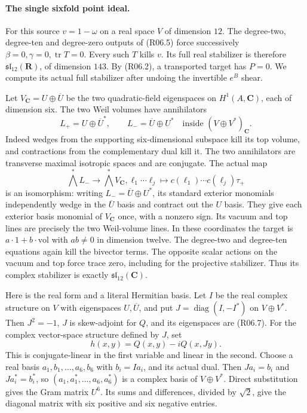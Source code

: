\paragraph{The single sixfold point ideal.}
For this source $v=1-\omega$ on a real space $V$ of dimension
$12$. The degree-two, degree-ten and degree-zero outputs of
(R06.5) force successively $\beta=0,\gamma=0,\operatorname{tr}T=0$.
Every such $T$ kills $v$. Its full real stabilizer is therefore
$\mathfrak{sl}_{12}(\mathbf R)$, of dimension $143$.
By (R06.2), a transported target has $P=0$. We compute its
actual full stabilizer after undoing the invertible $e^B$ shear.

Let $V_{\mathbf C}=U\oplus\overline U$ be the two quadratic-field
eigenspaces on $H^1(A,\mathbf C)$, each of dimension six.
The two Weil volumes have annihilators
\[
 L_+=U\oplus\overline U^*,\qquad
 L_-=\overline U\oplus U^*
          \quad\text{inside }(V\oplus V^*)_{\mathbf C}.       \tag{R06.7}
\]
Indeed wedges from the supporting six-dimensional subspace kill
its top volume, and contractions from the complementary dual kill
it. The two annihilators are transverse maximal isotropic spaces
and are conjugate. The actual map
\[
 \bigwedge^*L_-\longrightarrow\bigwedge^*V_{\mathbf C},
 \ell_1\cdots\ell_j\longmapsto
                  c(\ell_1)\cdots c(\ell_j)\tau_+             \tag{R06.8}
\]
is an isomorphism: writing $L_-=\overline U\oplus U^*$,
its standard exterior monomials independently wedge in the
$\overline U$ basis and contract out the $U$ basis. They give
each exterior basis monomial of $V_{\mathbf C}$ once, with a
nonzero sign. Its vacuum and top lines are precisely the two
Weil-volume lines. In these coordinates the target is
$a\cdot1+b\cdot\mathrm{vol}$ with $ab\ne0$ in dimension twelve.
The degree-two and degree-ten equations again kill the bivector
terms. The opposite scalar actions on the vacuum and top force
trace zero, including for the projective stabilizer. Thus its
complex stabilizer is exactly $\mathfrak{sl}_{12}(\mathbf C)$.

Here is the real form and a literal Hermitian basis. Let $I$ be
the real complex structure on $V$ with eigenspaces
$U,\overline U$, and put $J=\operatorname{diag}(I,-I^*)$ on
$V\oplus V^*$. Then $J^2=-1$, $J$ is skew-adjoint for $Q$,
and its eigenspaces are (R06.7). For the complex vector-space
structure defined by $J$, set
\[
                     h(x,y)=Q(x,y)-iQ(x,Jy).
\]
This is conjugate-linear in the first variable and linear in the
second. Choose a real basis $a_1,b_1,\ldots,a_6,b_6$ with
$b_i=Ia_i$, and its actual dual. Then
$Ja_i=b_i$ and $Ja_i^*=b_i^*$, so
$(a_1,a_1^*,\ldots,a_6,a_6^*)$ is a complex basis of
$V\oplus V^*$. Direct substitution gives the Gram matrix $U^6$.
Its sums and differences, divided by $\sqrt2$, give the diagonal
matrix with six positive and six negative entries.

